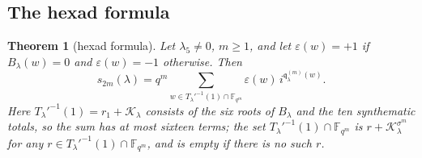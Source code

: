 \documentclass[12pt,a4paper]{amsart}
\newtheorem{theorem}{Theorem}[section]
\theoremstyle{definition}
\newcommand{\F}{\mathbb{F}}
\newcommand{\eps}{\varepsilon}
\newcommand{\Kk}{\mathcal{K}}
\newcommand{\qq}{\mathfrak{q}}
\begin{document}
\subsection{The hexad formula}
\begin{theorem}[hexad formula]\label{thm:hexadformula}
Let $\lambda_5\ne0$, $m\ge1$, and let $\eps(w)=+1$ if $B_\lambda(w)=0$ and $\eps(w)=-1$ otherwise. Then
\begin{equation}\label{eq:hexadformula}
s_{2m}(\lambda)=q^m\sum_{w\in T_\lambda'^{-1}(1)\cap\F_{q^m}}\eps(w)\,i^{\qq^{(m)}_\lambda(w)} .
\end{equation}
Here $T_\lambda'^{-1}(1)=r_1+\Kk_\lambda$ consists of the six roots of $B_\lambda$ and the ten synthematic totals, so the sum has at most sixteen terms; the set $T_\lambda'^{-1}(1)\cap\F_{q^m}$ is $r+\Kk_\lambda^{\sigma^m}$ for any $r\in T_\lambda'^{-1}(1)\cap\F_{q^m}$, and is empty if there is no such $r$.
\end{theorem}
\end{document}
